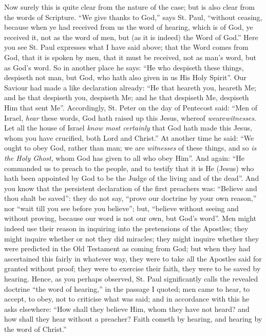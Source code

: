 Now surely this is quite clear from the nature of the case; but is
also clear from the words of Scripture. ``We give thanks to
God,'' says St. Paul, ``without ceasing, because when ye had
received from us the word of hearing, which is of God, ye received it,
not as the word of men, but (as it is indeed) the Word of God.''
Here you see St. Paul expresses what I have said above; that the Word
comes from God, that it is spoken by men, that it must be received,
not as man's word, but as God's word. So in another place he says:
``He who despiseth these things, despiseth not man, but God, who
hath also given in us His Holy Spirit''. Our Saviour had made a
like declaration already: ``He that heareth you, heareth Me; and
he that despiseth you, despiseth Me; and he that despiseth Me,
despiseth Him that sent Me''. Accordingly, St. Peter on the day of
Pentecost said: ``Men of Israel, \emph{hear} these words, God hath
raised up this Jesus, whereof \emph{we}are\emph{witnesses}. Let all
the house of Israel \emph{know most certainly} that God hath made this
Jesus, whom you have crucified, both Lord and Christ.'' At another
time he said: ``We ought to obey God, rather than man; we are \emph{witnesses}
of these things, and so \emph{is the Holy Ghost}, whom God has given
to all who obey Him''. And again: ``He commanded us to preach
to the people, and to testify that it is He (Jesus) who hath been
appointed by God to be the Judge of the living and of the dead''.
And you know that the persistent declaration of the first preachers
was: ``Believe and thou shalt be saved'': they do not say,
``prove our doctrine by your own reason,'' nor ``wait till
you see before you believe''; but, ``believe without seeing
and without proving, because our word is not our own, but God's
word''. Men might indeed use their reason in inquiring into the
pretensions of the Apostles; they might inquire whether or not they
did miracles; they might inquire whether they were predicted in the
Old Testament as coming from God; but when they had ascertained this
fairly in whatever way, they were to take all the Apostles said for
granted without proof; they were to exercise their faith, they were to
be saved by hearing. Hence, as you perhaps observed, St. Paul
significantly calls the revealed doctrine ``the word of
hearing,'' in the passage I quoted; men came to hear, to accept,
to obey, not to criticise what was said; and in accordance with this
he asks elsewhere: ``How shall they believe Him, whom they have
not heard? and how shall they hear without a preacher? Faith cometh by
hearing, and hearing by the word of Christ.''


